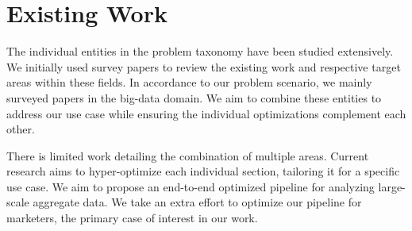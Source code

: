 \section{Existing Work}
The individual entities in the problem taxonomy have been studied extensively. We initially used survey papers\cite{Indexing}\cite{QueryProcessing}\cite{Caching}\cite{VisualizationTechniques} to review the existing work and respective target areas within these fields. In accordance to our problem scenario, we mainly surveyed papers in the big-data domain. We aim to combine these entities to address our use case while ensuring the individual optimizations complement each other. 

There is limited work detailing the combination of multiple areas. Current research aims to hyper-optimize each individual section, tailoring it for a specific use case. We aim to propose an end-to-end optimized pipeline for analyzing large-scale aggregate data. We take an extra effort to optimize our pipeline for marketers, the primary case of interest in our work.